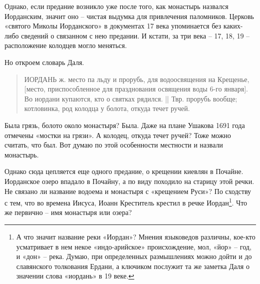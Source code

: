 Однако, если предание возникло уже после того, как монастырь назвался Иорданским, значит оно – чистая выдумка для привлечения паломников. Церковь «святого Миколы Иорданского» в документах 17 века упоминается без каких-либо сведений о связанном с нею предании. И кстати, за три века – 17, 18, 19 – расположение колодцев могло меняться.

Но откроем словарь Даля.

\begin{quotation}
ИОРДАНЬ ж. место па льду и прорубь, для водоосвящения на Крещенье, [место, приспособленное для празднования освящения воды 6-го января]. Во иордани купаются, кто о святках  рядился. || Твр. прорубь вообще; котловинка, род колодца у болота, откуда течет ручей.
\end{quotation}

Была грязь, болото около монастыря? Была. Даже на плане Ушакова 1691 года отмечены «мостки на грязи». А колодец, откуда течет ручей? Тоже можно считать, что был. Вот думаю по этой особенности местности и назвали монастырь.

Однако сюда цепляется еще одного предание, о крещении киевлян в Почайне. Иорданское озеро впадало в Почайну, а по виду походило на старицу этой речки. Не связано ли название водоема и монастыря с «крещением Руси»? По сходству с тем, что во времена Иисуса, Иоанн Креститель крестил в речке Иордан\footnote{А что значит название реки «Иордан»? Мнения языковедов различны, кое-кто усматривает в нем некое «индо-арийское» происхождение, мол, «йор» – год, и «дон» – река. Думаю, при определенных размышлениях можно дойти и до славянского толкования Ердани, а ключиком послужит та же заметка Даля о значении слова «иордань» в 19 веке.}. Что же первично – имя монастыря или озера?
